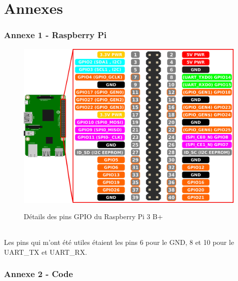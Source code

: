 \part*{Annexes}

\section*{Annexe 1 - Raspberry Pi}
    
    \begin{figure}[H]
        \centering
    	\begin{frame}{\includegraphics[width=1\textwidth]{image/gpioRPi.png}}
    	\end{frame}
    	\caption{\label{fig:gpioRPi}Détails des pins GPIO du Raspberry Pi 3 B+}
    \end{figure}
    
    \paragraph*{}
    Les pins qui m'ont été utiles étaient les pins 6 pour le GND, 8 et 10 pour le UART\_TX et UART\_RX.


\newpage
\section*{Annexe 2 - Code}

    \paragraph*{}
    
    
